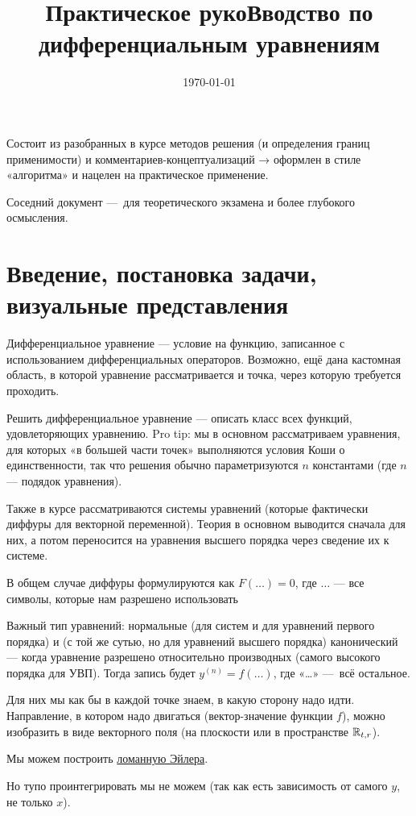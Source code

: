 \documentclass[12pt, a4paper]{article}
\title{Практическое рукоВводство по дифференциальным уравнениям}
\author{
  \vova
}
\date{\today}
\begin{document}
\tittoc

Состоит из разобранных в курсе методов решения 
(и определения границ применимости) и комментариев-концептуализаций
→ оформлен в стиле «алгоритма» и нацелен на практическое применение.

Соседний документ — для теоретического экзамена и более глубокого осмысления.

\section{Введение, постановка задачи, визуальные представления}

Дифференциальное уравнение — условие на функцию, записанное с использованием дифференциальных операторов.
Возможно, ещё дана кастомная область, в которой уравнение рассматривается и точка, через которую требуется проходить.

Решить дифференциальное уравнение — описать класс всех функций, удовлеторяющих уравнению.
Pro tip: мы в основном рассматриваем уравнения, для которых «в большей части точек» выполняются условия Коши о единственности,
так что решения обычно параметризуются $n$ константами (где $n$ — подядок уравнения).

Также в курсе рассматриваются системы уравнений (которые фактически диффуры для векторной переменной).
Теория в основном выводится сначала для них, а потом переносится на уравнения высшего порядка через сведение их к системе.

В общем случае диффуры формулируются как $F(…) = 0$, где $…$ — все символы, которые нам разрешено использовать

Важный тип уравнений: нормальные (для систем и для уравнений первого порядка) и (с той же сутью, но для уравнений высшего порядка) канонический 
— когда уравнение разрешено относительно производных (самого высокого порядка для УВП). Тогда запись будет $y^{(n)} = f(…)$, где «…» — всё остальное.

Для них мы как бы в каждой точке знаем, в какую сторону надо идти.
Направление, в котором надо двигаться (вектор-значение функции $f$), 
можно изобразить в виде векторного поля (на плоскости или в пространстве ${\mathbb{R}}_{t, r}$).


Мы можем построить \href{
    https://ru.wikipedia.org/wiki/%
}{ломанную Эйлера}.

Но тупо проинтегрировать мы не можем (так как есть зависимость от самого $y$, не только $x$).
\end{document}
